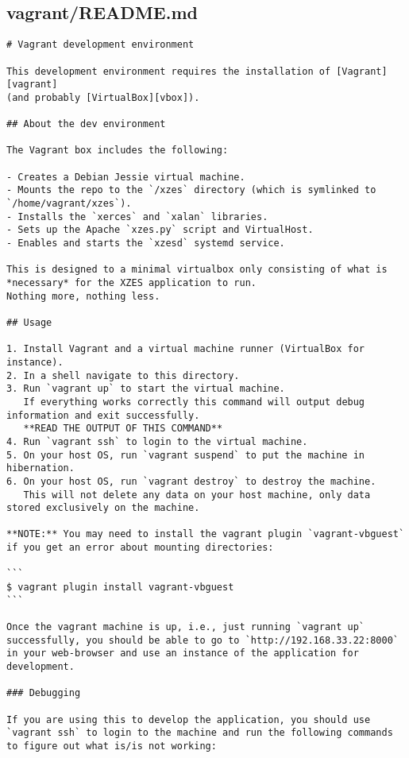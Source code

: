 \subsection{vagrant/README.md}
\begin{lstlisting}[caption={Vagrant development environment README.}]
# Vagrant development environment

This development environment requires the installation of [Vagrant][vagrant]
(and probably [VirtualBox][vbox]).

## About the dev environment

The Vagrant box includes the following:

- Creates a Debian Jessie virtual machine.
- Mounts the repo to the `/xzes` directory (which is symlinked to `/home/vagrant/xzes`).
- Installs the `xerces` and `xalan` libraries.
- Sets up the Apache `xzes.py` script and VirtualHost.
- Enables and starts the `xzesd` systemd service.

This is designed to a minimal virtualbox only consisting of what is
*necessary* for the XZES application to run.
Nothing more, nothing less.

## Usage

1. Install Vagrant and a virtual machine runner (VirtualBox for instance).
2. In a shell navigate to this directory.
3. Run `vagrant up` to start the virtual machine.
   If everything works correctly this command will output debug information and exit successfully.
   **READ THE OUTPUT OF THIS COMMAND**
4. Run `vagrant ssh` to login to the virtual machine.
5. On your host OS, run `vagrant suspend` to put the machine in hibernation.
6. On your host OS, run `vagrant destroy` to destroy the machine.
   This will not delete any data on your host machine, only data stored exclusively on the machine.

**NOTE:** You may need to install the vagrant plugin `vagrant-vbguest` if you get an error about mounting directories:

```
$ vagrant plugin install vagrant-vbguest
```

Once the vagrant machine is up, i.e., just running `vagrant up` successfully, you should be able to go to `http://192.168.33.22:8000` in your web-browser and use an instance of the application for development.

### Debugging

If you are using this to develop the application, you should use `vagrant ssh` to login to the machine and run the following commands to figure out what is/is not working:


\end{lstlisting}
